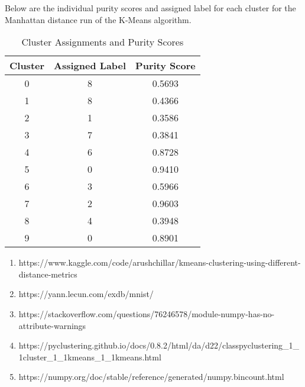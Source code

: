 \documentclass[twoside,10pt]{article}
\begin{document}
Below are the individual purity scores and assigned label for each cluster for the Manhattan distance
run of the K-Means algorithm.


\begin{table}[h!]
\centering
\begin{tabular}{|c|c|c|}
\hline
\textbf{Cluster} & \textbf{Assigned Label} & \textbf{Purity Score} \\
\hline
0 & 8 & 0.5693 \\
1 & 8 & 0.4366 \\
2 & 1 & 0.3586 \\
3 & 7 & 0.3841 \\
4 & 6 & 0.8728 \\
5 & 0 & 0.9410 \\
6 & 3 & 0.5966 \\
7 & 2 & 0.9603 \\
8 & 4 & 0.3948 \\
9 & 0 & 0.8901 \\
\hline
\end{tabular}
\caption{Cluster Assignments and Purity Scores}
\label{tab:cluster_purity}
\end{table}

\begin{enumerate}
\item https://www.kaggle.com/code/arushchillar/kmeans-clustering-using-different-distance-metrics
\item https://yann.lecun.com/exdb/mnist/
\item https://stackoverflow.com/questions/76246578/module-numpy-has-no-attribute-warnings
\item https://pyclustering.github.io/docs/0.8.2/html/da/d22/classpyclustering_1_1cluster_1_1kmeans_1_1kmeans.html
\item https://numpy.org/doc/stable/reference/generated/numpy.bincount.html
\end{enumerate}
\end{document}
